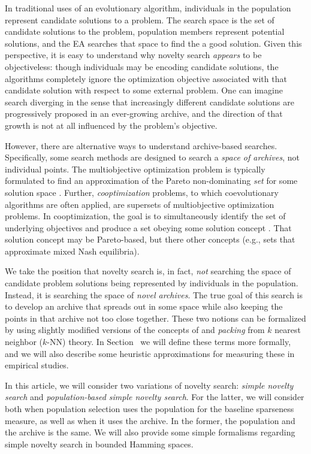 \documentclass[twoside]{article}
\begin{document}
In traditional uses of an evolutionary algorithm, individuals in the population represent candidate solutions to a problem.  The search space is the set of candidate solutions to the problem, population members represent potential solutions, and the EA searches that space to find the a good solution.  Given this perspective, it is easy to understand why novelty search \emph{appears} to be objectiveless:  though individuals may be encoding candidate solutions, the algorithms completely ignore the optimization objective associated with that candidate solution with respect to some external problem.  One can imagine search diverging in the sense that increasingly different candidate solutions are progressively proposed in an ever-growing archive, and the direction of that growth is not at all influenced by the problem's objective.  

However, there are alternative ways to understand archive-based searches.  Specifically, some search methods are designed to search a \emph{space of archives}, not individual points.  The multiobjective optimization problem is typically formulated to find an approximation of the Pareto non-dominating \emph{set} for some solution space \citep{SeadaDeb2018moo,Zitzler2012,Zitzler2000ecj}.  Further, \emph{cooptimization} problems, to which coevolutionary algorithms are often applied, are supersets of multiobjective optimization problems.  In cooptimization, the goal is to simultaneously identify the set of underlying objectives and produce a set obeying some solution concept \citep{FiciciPollack2001ecal,BucciPollack2002foga,Popovici2012,Ficici2008mpsn}.  That solution concept may be Pareto-based, but there other concepts (e.g., sets that approximate mixed Nash equilibria).

We take the position that novelty search is, in fact, \emph{not} searching the space of candidate problem solutions being represented by individuals in the population.  Instead, it is searching the space of \emph{novel archives}.  The true goal of this search is to develop an archive that spreads out in some space while also keeping the points in that archive not too close together.  These two notions can be formalized by using slightly modified versions of the concepts of  and \emph{packing} from $k$ nearest neighbor ($k$-NN) theory.  In Section~\pageref{subsec:knn} we will define these terms more formally, and we will also describe some heuristic approximations for measuring these in empirical studies.

In this article, we will consider two variations of novelty search:  \emph{simple novelty search} and \emph{population-based simple novelty search}.  For the latter, we will consider both when population selection uses the population for the baseline sparseness measure, as well as when it uses the archive.   In the former, the population and the archive is the same.  We will also provide some simple formalisms regarding  simple novelty search in bounded Hamming spaces.
\end{document}
